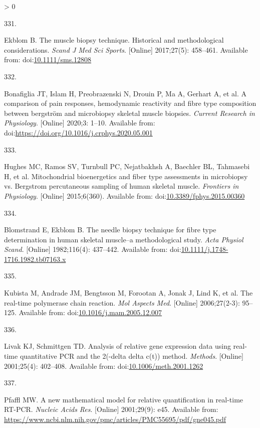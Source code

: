 \documentclass[twoside,10pt]{gihclass} %
\newlength{\cslhangindent}
\newlength{\csllabelwidth}
\newenvironment{CSLReferences}[3] %
 {%
  \setlength{\parindent}{0pt}
  \ifodd #1 \everypar{\setlength{\hangindent}{\cslhangindent}}\ignorespaces\fi
  \ifnum #2 > 0
  \setlength{\parskip}{#2\baselineskip}
  \fi
 }%
 {}
\newcommand{\CSLLeftMargin}[1]{\parbox[t]{\maxof{\widthof{#1}}{\csllabelwidth}}{#1}}
\newcommand{\CSLRightInline}[1]{\parbox[t]{\linewidth}{#1}}
\begin{document}
\begin{CSLReferences}{0}{0}
\leavevmode\hypertarget{ref-RN2549}{}%
\CSLLeftMargin{331. }
\CSLRightInline{Ekblom B. The muscle biopsy technique. Historical and methodological considerations. \emph{Scand J Med Sci Sports}. {[}Online{]} 2017;27(5): 458--461. Available from: doi:\href{https://doi.org/10.1111/sms.12808}{10.1111/sms.12808}}

\leavevmode\hypertarget{ref-RN2553}{}%
\CSLLeftMargin{332. }
\CSLRightInline{Bonafiglia JT, Islam H, Preobrazenski N, Drouin P, Ma A, Gerhart A, et al. A comparison of pain responses, hemodynamic reactivity and fibre type composition between bergström and microbiopsy skeletal muscle biopsies. \emph{Current Research in Physiology}. {[}Online{]} 2020;3: 1--10. Available from: doi:\url{https://doi.org/10.1016/j.crphys.2020.05.001}}

\leavevmode\hypertarget{ref-RN2552}{}%
\CSLLeftMargin{333. }
\CSLRightInline{Hughes MC, Ramos SV, Turnbull PC, Nejatbakhsh A, Baechler BL, Tahmasebi H, et al. Mitochondrial bioenergetics and fiber type assessments in microbiopsy vs. Bergstrom percutaneous sampling of human skeletal muscle. \emph{Frontiers in Physiology}. {[}Online{]} 2015;6(360). Available from: doi:\href{https://doi.org/10.3389/fphys.2015.00360}{10.3389/fphys.2015.00360}}

\leavevmode\hypertarget{ref-RN874}{}%
\CSLLeftMargin{334. }
\CSLRightInline{Blomstrand E, Ekblom B. The needle biopsy technique for fibre type determination in human skeletal muscle--a methodological study. \emph{Acta Physiol Scand}. {[}Online{]} 1982;116(4): 437--442. Available from: doi:\href{https://doi.org/10.1111/j.1748-1716.1982.tb07163.x}{10.1111/j.1748-1716.1982.tb07163.x}}

\leavevmode\hypertarget{ref-RN2099}{}%
\CSLLeftMargin{335. }
\CSLRightInline{Kubista M, Andrade JM, Bengtsson M, Forootan A, Jonak J, Lind K, et al. The real-time polymerase chain reaction. \emph{Mol Aspects Med}. {[}Online{]} 2006;27(2-3): 95--125. Available from: doi:\href{https://doi.org/10.1016/j.mam.2005.12.007}{10.1016/j.mam.2005.12.007}}

\leavevmode\hypertarget{ref-RN2100}{}%
\CSLLeftMargin{336. }
\CSLRightInline{Livak KJ, Schmittgen TD. Analysis of relative gene expression data using real-time quantitative PCR and the 2(-delta delta c(t)) method. \emph{Methods}. {[}Online{]} 2001;25(4): 402--408. Available from: doi:\href{https://doi.org/10.1006/meth.2001.1262}{10.1006/meth.2001.1262}}

\leavevmode\hypertarget{ref-RN2101}{}%
\CSLLeftMargin{337. }
\CSLRightInline{Pfaffl MW. A new mathematical model for relative quantification in real-time RT-PCR. \emph{Nucleic Acids Res}. {[}Online{]} 2001;29(9): e45. Available from: \url{https://www.ncbi.nlm.nih.gov/pmc/articles/PMC55695/pdf/gne045.pdf}}


\end{CSLReferences}
\end{document}
